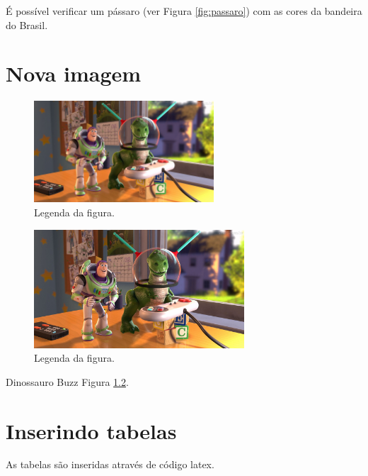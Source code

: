 \documentclass[
	12pt,				%
  openright,			%
	twoside,			%
	a4paper,			%
	english,			%
	french,				%
	spanish,			%
	brazil				%
	]{abntex2}
\begin{document}
É possível verificar um pássaro (ver Figura \ref{fig:passaro}) com as
cores da bandeira do Brasil.

\chapter{Nova imagem}\label{nova-imagem}

\begin{figure}[htbp]
\caption{\label{fig:rex}Legenda da figura.}
\begin{center}
\includegraphics[width=0.6\textwidth]{imagens/Buzz-e-Rex-Jogando-Videogame-Toy-Story_1920x1080.jpg}
\end{center}
\end{figure}
\begin{figure}[htbp]
\caption{\label{fig:rex}Legenda da figura.}
\begin{center}
\includegraphics[width=0.7\textwidth]{imagens/Buzz-e-Rex-Jogando-Videogame-Toy-Story_1920x1080.jpg}
\end{center}
\end{figure}

Dinossauro Buzz Figura \ref{fig:rex}.

\chapter{Inserindo tabelas}\label{cap:inserir-tabelas}

As tabelas são inseridas através de código latex.
\end{document}
